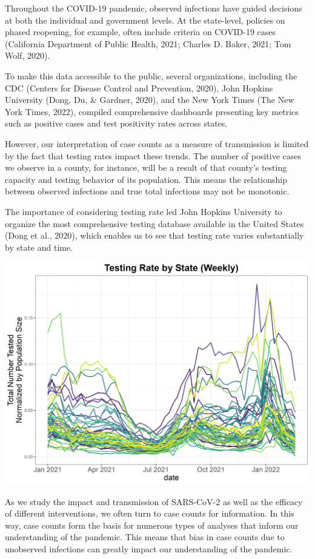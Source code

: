 \documentclass[12pt,twoside]{smiththesis}
\begin{document}
\vspace{.2 mm}
Throughout the COVID-19 pandemic, observed infections have guided decisions at both the individual and government levels. At the state-level, policies on phased reopening, for example, often include criteria on COVID-19 cases (California Department of Public Health, 2021; Charles D. Baker, 2021; Tom Wolf, 2020).

To make this data accessible to the public, several organizations, including the CDC (Centers for Disease Control and Prevention, 2020), John Hopkins University (Dong, Du, \& Gardner, 2020), and the New York Times (The New York Times, 2022), compiled comprehensive dashboards presenting key metrics such as positive cases and test positivity rates across states.

However, our interpretation of case counts as a measure of transmission is limited by the fact that testing rates impact these trends. The number of positive cases we observe in a county, for instance, will be a result of that county's testing capacity and testing behavior of its population. This means the relationship between observed infections and true total infections may not be monotonic.

The importance of considering testing rate led John Hopkins University to organize the most comprehensive testing database available in the United States (Dong et al., 2020), which enables us to see that testing rate varies substantially by state and time.

\includegraphics[width=0.9\linewidth]{./figure/testing_rate}

As we study the impact and transmission of SARS-CoV-2 as well as the efficacy of different interventions, we often turn to case counts for information. In this way, case counts form the basis for numerous types of analyses that inform our understanding of the pandemic. This means that bias in case counts due to unobserved infections can greatly impact our understanding of the pandemic.
\end{document}
